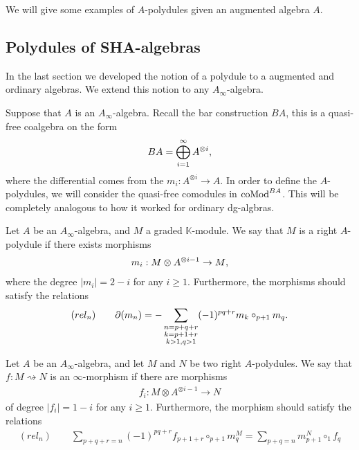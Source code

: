 \documentclass[../thesis.tex]{subfiles}
\begin{document}
            We will give some examples of $A$-polydules given an augmented algebra $A$.\todo{!!!}

        \subsection{Polydules of SHA-algebras}
            In the last section we developed the notion of a polydule to a augmented and ordinary algebras. We extend this notion to any $A_\infty$-algebra.

            Suppose that $A$ is an $A_\infty$-algebra. Recall the bar construction $BA$, this is a quasi-free coalgebra on the form
            \begin{align*}
                BA = \bigoplus_{i=1}^\infty A^{\otimes i}\tt{,}
            \end{align*}
            where the differential comes from the $m_i : A^{\otimes i} \rightarrow A$. In order to define the $A$-polydules, we will consider the quasi-free comodules in $\tt{coMod}^{BA}$. This will be completely analogous to how it worked for ordinary dg-algbras.
            
            \begin{definition}[$A$-polydule]
                Let $A$ be an $A_\infty$-algebra, and $M$ a graded $\mathbb{K}$-module. We say that $M$ is a right $A$-polydule if there exists morphisms
                \begin{align*}
                    m_i : M \otimes A^{\otimes i - 1} \rightarrow M\tt{,}
                \end{align*}
                where the degree $|m_i| = 2 - i$ for any $i \geq 1$. Furthermore, the morphisms should satisfy the relations
                \begin{align*}
                    (rel_n) \qquad \partial(m_n) = - \sum_{\substack{n = p + q + r \\ k = p + 1 + r \\ k > 1, q > 1}}(-1)^{pq+r}m_k\circ_{p+1}m_q\tt{.}
                \end{align*}
            \end{definition}

            \begin{definition}
                Let $A$ be an $A_\infty$-algebra, and let $M$ and $N$ be two right $A$-polydules. We say that $f : M \rightsquigarrow N$ is an $\infty$-morphism if there are morphisms
                \begin{align*}
                    f_i : M \otimes A^{\otimes i - 1} \rightarrow N
                \end{align*}
                of degree $|f_i| = 1 - i$ for any $i \geq 1$. Furthermore, the morphism should satisfy the relations
                \begin{align*}
                    (rel_n)\qquad \sum_{p+q+r = n} (-1)^{pq+r}f_{p+1+r} \circ_{p+1} m^M_{q} = \sum_{p+q = n} m^N_{p+1} \circ_1 f_q
                \end{align*}
            \end{definition}
\end{document}
